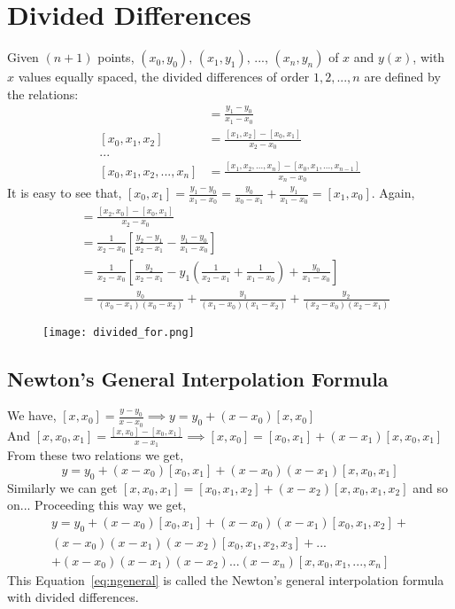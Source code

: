 \documentclass[aima203_lecturenotes_ku.tex]{subfiles}
\begin{document}
\section{Divided Differences}
Given $(n+1)$ points, $(x_0,y_0), \, (x_1,y_1), \, ..., \, (x_n,y_n)$ of $x$ and $y(x)$, with $x$ values equally spaced, the divided differences of order $1,2,...,n$ are defined by the relations:
\begin{align*}
  [x_0,x_1] &= \frac{y_1 - y_0}{x_1 - x_0} \\[1mm]
  [x_0,x_1,x_2] &= \frac{[x_1, x_2]-[x_0,x_1]}{x_2 - x_0} \\[1mm]
  ... \\
  [x_0,x_1,x_2,...,x_n] &= \frac{[x_1, x_2,...,x_n]-[x_0,x_1,...,x_{n-1}]}{x_n - x_0}
\end{align*}
It is easy to see that, $\displaystyle [x_0,x_1] = \frac{y_1 - y_0}{x_1 - x_0} = \frac{y_0}{x_0 - x_1} + \frac{y_1}{x_1 - x_0} = [x_1,x_0]$.
Again,
\begin{align*}
  [x_0,x_1,x_2] &= \frac{[x_2, x_0]-[x_0,x_1]}{x_2 - x_0} \\[1mm]
                &= \frac{1}{x_2 - x_0} \left [ \frac{y_2- y_1}{x_2 - x_1} - \frac{y_1 - y_0}{x_1 - x_0} \right ] \\[1mm]
                  &= \frac{1}{x_2 - x_0} \left [ \frac{y_2}{x_2 - x_1} -y_1 \left ( \frac{1}{x_2-x_1} + \frac{1}{x_1 - x_0} \right ) + \frac{y_0}{x_1 - x_0} \right ] \\[1mm]
  &= \frac{y_0}{(x_0-x_1)(x_0-x_2)} + \frac{y_1}{(x_1-x_0)(x_1-x_2)} + \frac{y_2}{(x_2-x_0)(x_2-x_1)}
\end{align*}
\begin{figure}[h]
  \centering
\texttt{[image: divided\_for.png]}
\end{figure}
\subsection{Newton's General Interpolation Formula}
We have,  $\displaystyle [x,x_0] = \frac{y - y_0}{x - x_0} \implies y = y_0 + (x-x_0)[x,x_0]$ \\[1mm]
And $\displaystyle [x,x_0,x_1] =  \frac{[x, x_0]-[x_0,x_1]}{x - x_1} \implies [x,x_0] = [x_0,x_1] + (x-x_1)[x,x_0,x_1]$ \\[1mm]
From these two relations we get,
\begin{equation}
  \label{ninter}
  y = y_0 + (x-x_0)[x_0,x_1] + (x-x_0)(x-x_1)[x,x_0,x_1]
\end{equation}
Similarly we can get $[x,x_0,x_1] =  [x_0,x_1,x_2] + (x-x_2)[x,x_0,x_1,x_2]$ and so on...
Proceeding this way we get,
\begin{equation}
  \label{eq:ngeneral}
  \begin{gathered}
    y = y_0 + (x-x_0)[x_0,x_1] + (x-x_0)(x-x_1)[x_0,x_1,x_2] + \\[1mm]
    (x-x_0)(x-x_1)(x-x_2)[x_0,x_1,x_2,x_3] + ... \\[1mm]
    + (x-x_0)(x-x_1)(x-x_2)...(x-x_n)[x,x_0,x_1,...,x_n]
  \end{gathered}
  \end{equation}
  This Equation~\ref{eq:ngeneral} is called the Newton's general interpolation formula with divided differences.
\end{document}
